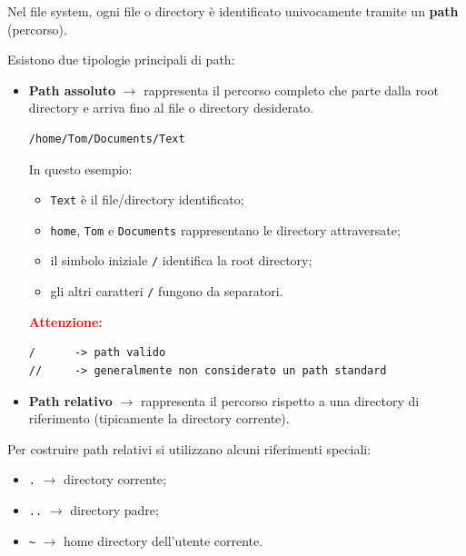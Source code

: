 Nel file system, ogni file o directory è identificato univocamente tramite un \textbf{path} (percorso).

Esistono due tipologie principali di path:

\begin{itemize}

    \item \textbf{Path assoluto} $\rightarrow$ rappresenta il percorso completo che parte dalla root directory e arriva fino al file o directory desiderato.

\begin{verbatim}
/home/Tom/Documents/Text
\end{verbatim}

\noindent
In questo esempio:

\begin{itemize}
    \item \texttt{Text} è il file/directory identificato;
    
    \item \texttt{home}, \texttt{Tom} e \texttt{Documents} rappresentano le directory attraversate;
    
    \item il simbolo iniziale \texttt{/} identifica la root directory;
    
    \item gli altri caratteri \texttt{/} fungono da separatori.
\end{itemize}

\medskip

\noindent
\textbf{\textcolor{red}{Attenzione:}}
\begin{verbatim}
/      -> path valido
//     -> generalmente non considerato un path standard
\end{verbatim}

\bigskip

    \item \textbf{Path relativo} $\rightarrow$ rappresenta il percorso rispetto a una directory di riferimento (tipicamente la directory corrente).
    
\end{itemize}

\medskip

Per costruire path relativi si utilizzano alcuni riferimenti speciali:

\begin{itemize}
    \item \texttt{.} $\rightarrow$ directory corrente;
    
    \item \texttt{..} $\rightarrow$ directory padre;
    
    \item \texttt{\textasciitilde} $\rightarrow$ home directory dell’utente corrente.
\end{itemize}

